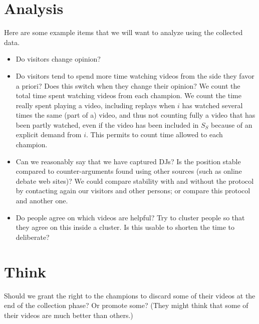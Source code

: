 \documentclass[version=3.21, pagesize, twoside=off, bibliography=totoc, DIV=calc, fontsize=12pt, a4paper]{scrartcl}
\begin{document}
\section{Analysis}
Here are some example items that we will want to analyze using the collected data.
\begin{itemize}
	\item Do visitors change opinion?
	\item Do visitors tend to spend more time watching videos from the side they favor a priori? Does this switch when they change their opinion? We count the total time spent watching videos from each champion. We count the time really spent playing a video, including replays when $i$ has watched several times the same (part of a) video, and thus not counting fully a video that has been partly watched, even if the video has been included in $S_S$ because of an explicit demand from $i$. This permits to count time allowed to each champion.
	\item Can we reasonably say that we have captured \acp{DJ}? Is the position stable compared to counter-arguments found using other sources (such as online debate web sites)? We could compare stability with and without the protocol by contacting again our visitors and other persons; or compare this protocol and another one.
	\item Do people agree on which videos are helpful? Try to cluster people so that they agree on this inside a cluster. Is this usable to shorten the time to deliberate?
\end{itemize}

\section{Think}
Should we grant the right to the champions to discard some of their videos at the end of the collection phase? Or promote some? (They might think that some of their videos are much better than others.)


\end{document}
